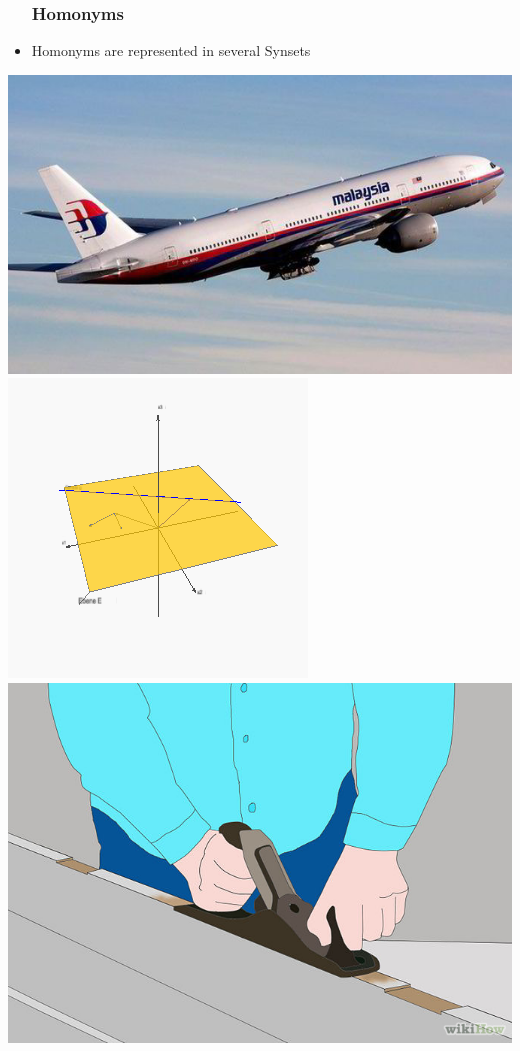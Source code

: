 \begin{frame}
\begin{itemize}
\frametitle{Homonyms}
\item Homonyms are represented in several Synsets
\end{itemize}
\includegraphics[scale=0.25]{img/plane2.jpg}
\includegraphics[scale=0.29]{img/wordnet_plane1.png}
\includegraphics[scale=0.18]{img/plane3.jpg}
\end{frame}


